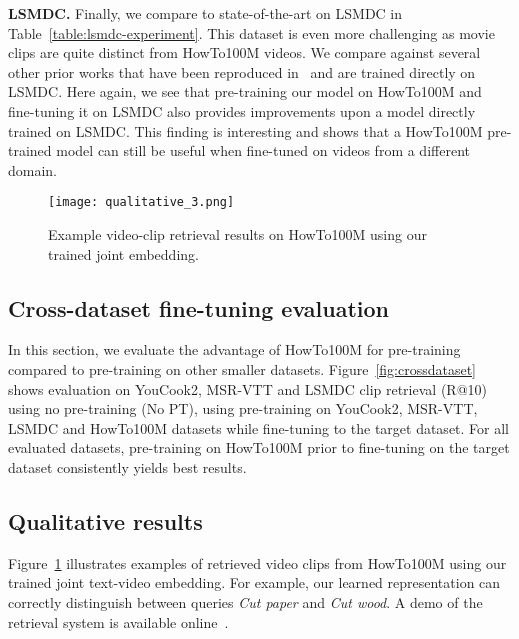 \documentclass[10pt,twocolumn,letterpaper]{article}
\begin{document}
{\bf \noindent LSMDC.}
Finally, we compare to state-of-the-art on LSMDC in Table~\ref{table:lsmdc-experiment}.
This dataset is even more challenging as movie clips are quite distinct from HowTo100M videos.
We compare against several other prior works that have been reproduced in~\cite{yu18joint} and are trained directly on LSMDC.
Here again, we see that pre-training our model on HowTo100M and fine-tuning it on LSMDC also provides improvements upon a model directly trained on LSMDC.
This finding is interesting and shows that a HowTo100M pre-trained model can still be useful when fine-tuned on videos from a different domain.


\begin{figure}[t]
  \begin{center}
     \texttt{[image: qualitative\_3.png]}
\end{center}
\vspace{-0.7cm}
  \caption{Example video-clip retrieval results on HowTo100M using our trained joint embedding.}
\label{fig:qualitative}
\end{figure}


\subsection{Cross-dataset fine-tuning evaluation}
In this section, we evaluate the advantage of HowTo100M for pre-training compared to pre-training on other smaller datasets.
Figure~\ref{fig:crossdataset} shows evaluation on YouCook2, MSR-VTT and LSMDC clip retrieval (R@10) using no pre-training (No PT), using pre-training on YouCook2, MSR-VTT, LSMDC and HowTo100M datasets while fine-tuning to the target dataset.
For all evaluated datasets, pre-training on HowTo100M prior to fine-tuning on the target dataset consistently yields best results.





\subsection{Qualitative results}
Figure~\ref{fig:qualitative} illustrates examples of retrieved video clips from HowTo100M using our trained joint text-video embedding.
For example, our learned representation can correctly distinguish between queries \textit{Cut paper} and \textit{Cut wood}. 
A demo of the retrieval system is available online~\cite{iccv2019howto100m}.
 
\end{document}
